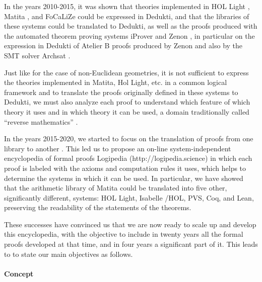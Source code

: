 In the years 2010-2015, it was shown that theories implemented in {\sc
HOL Light} \cite{Assaf12}, {\sc Matita} \cite{Assaf15}, and {\sc
FoCaLiZe} \cite{Cauderlier16} could be expressed in {\sc Dedukti},
and that the libraries of these systems could be translated to {\sc
Dedukti}, as well as the proofs produced with the automated theorem
proving systems {\sc iProver} \cite{Burel10} and {\sc Zenon}
\cite{CauderlierHalmagrand15}, in particular on the expression in {\sc
  Dedukti} of {\sc Atelier B} proofs produced by {\sc Zenon} and also
by the SMT solver {\sc Archsat} \cite{Bury19}.

Just like for the case of non-Euclidean geometries, it is not
sufficient to express the theories implemented in {\sc Matita}, {\sc
  Hol Light}, etc.  in a common logical framework and to translate the
proofs originally defined in these systems to {\sc Dedukti}, we must
also analyze each proof to understand which feature of which theory it
uses and in which theory it can be used, a domain traditionally called
“reverse mathematics” \cite{Friedman76,Simpson09,Dowek17}.


In the years 2015-2020, we started to focus on the translation of
proofs from one library to another \cite{Dowek17,Thire18}. This led us
to propose an on-line system-independent encyclopedia of formal proofs
Logipedia (http://logipedia.science) in which each proof is labeled
with the axioms and computation rules it uses, which helps to
determine the systems in which it can be used. In particular, we have
showed that the arithmetic library of {\sc Matita} could be translated
into five other, significantly different, systems: {\sc HOL Light},
{\sc Isabelle /HOL}, {\sc PVS}, {\sc Coq}, and {\sc Lean}, preserving
the readability of the statements of the theorems.

These successes have convinced us that we are now ready to scale up
and develop this encyclopedia, with the objective to include in twenty
years all the formal proofs developed at that time, and in four years a
significant part of it. This leads to to state our main objectives as
follows.

\paragraph{Concept}

